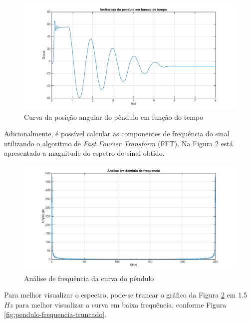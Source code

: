 \documentclass[a4paper]{instrumentacao}
\begin{document}
\begin{figure}[H]
\centering
\includegraphics[width=\textwidth]{angle-time-plot.pdf}
\caption{Curva da posição angular do pêndulo em função do tempo}
\label{fig:pendulo-curva-angulo-vs-tempo}
\end{figure}

Adicionalmente, é possível calcular as componentes de frequência do sinal utilizando o algoritmo de \textit{Fast Fourier Transform} (FFT). Na Figura \ref{fig:pendulo-frequencia} está apresentado a magnitude do espetro do sinal obtido.

\begin{figure}[H]
\centering
\includegraphics[width=\textwidth]{frequency-plot.pdf}
\caption{Análise de frequência da curva do pêndulo}
\label{fig:pendulo-frequencia}
\end{figure}

Para melhor visualizar o espectro, pode-se truncar o gráfico da Figura \ref{fig:pendulo-frequencia} em 1.5 $Hz$ para melhor visualizar a curva em baixa frequência, conforme Figura \ref{fig:pendulo-frequencia-truncado}.
\end{document}
